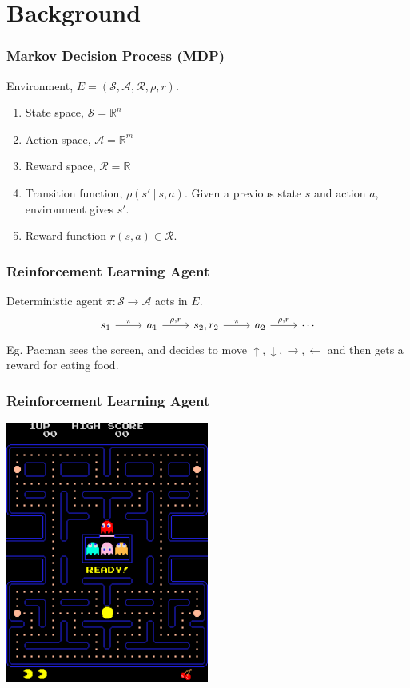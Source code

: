\documentclass{beamer}
\numberwithin{equation}{subsection}
\numberwithin{theorem}{subsection}
\begin{document}
\section{Background}
\begin{frame}
  \frametitle{Markov Decision Process (MDP)}
    Environment, $E = (\mathcal{S}, \mathcal{A}, \mathcal{R}, \rho, r)$. 
    \begin{enumerate}
    \item State space, $\mathcal{S} = \mathbb{R}^n$
    \item Action space, $\mathcal{A} = \mathbb{R}^m$
    \item Reward space, $\mathcal{R} = \mathbb{R}$   
    \item Transition function, $\rho(s'\ |\ s,a)$. Given a previous state $s$ and action $a$, environment gives $s'$.
    \item Reward function $r(s,a) \in \mathcal{R}$.
    \end{enumerate}
\end{frame} 
\begin{frame}[fragile]
  \frametitle{Reinforcement Learning Agent}
    Deterministic agent $\pi: \mathcal{S} \to \mathcal{A}$ acts in $E$. 
    \begin{equation*}
      \begin{tikzcd}
          s_1 \arrow{r}{\pi} & a_1 \arrow{r}{\rho, r} & s_2, r_2 \arrow{r}{\pi}& a_2  \arrow{r}{\rho, r} & \cdots
         \end{tikzcd}   
    \end{equation*}
    Eg. Pacman sees the screen, and decides to move $\uparrow, \downarrow, \rightarrow, \leftarrow$ and then gets a reward for eating food.
\end{frame}
\begin{frame}
\frametitle{Reinforcement Learning Agent}
  \begin{center}
    \includegraphics[width=0.5\textwidth]{Pac-man.png}
  \end{center}
\end{frame}
\end{document}
